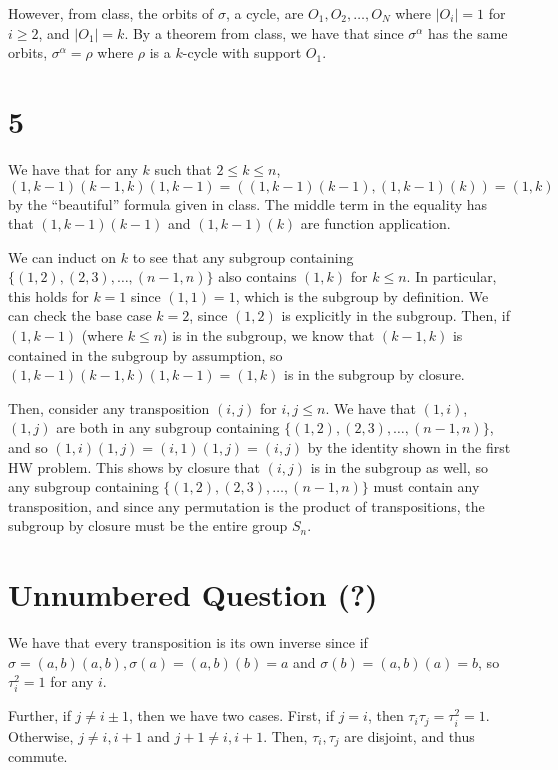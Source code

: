 \documentclass[12pt,letterpaper]{article}
\theoremstyle{definition}
\begin{document}
However, from class, the orbits of $\sigma$, a cycle, are $O_{1},O_{2},\dots, O_{N}$ where $|O_{i}| = 1$ for $i \geq 2$, and $|O_{1}| = k$. By a theorem from class, we have that since $\sigma^{\alpha}$ has the same orbits, $\sigma^{\alpha} = \rho$ where $\rho$ is a $k$-cycle with support $O_{1}$.

\section*{5}

We have that for any $k$ such that $2 \leq k \leq n$, $(1,k-1)(k-1, k)(1, k-1) = ((1,k-1)(k-1), (1,k-1)(k)) = (1,k)$ by the ``beautiful'' formula given in class. The middle term in the equality has that $(1, k-1)(k-1)$ and $(1,k-1)(k)$ are function application.

We can induct on $k$ to see that any subgroup containing $\{(1,2),(2,3),\dots,(n-1,n)\}$ also contains $(1,k)$ for $k \leq n$. In particular, this holds for $k = 1$ since $(1,1) = 1$, which is the subgroup by definition. We can check the base case $k = 2$, since $(1,2)$ is explicitly in the subgroup. Then, if $(1,k-1)$ (where $k \leq n$) is in the subgroup, we know that $(k-1, k)$ is contained in the subgroup by assumption, so $(1,k-1)(k-1,k)(1,k-1) = (1,k)$ is in the subgroup by closure.

Then, consider any transposition $(i,j)$ for $i,j \leq n$. We have that $(1,i)$, $(1,j)$ are both in any subgroup containing $\{(1,2),(2,3),\dots,(n-1,n)\}$, and so $(1,i)(1,j) = (i,1)(1,j) = (i,j)$ by the identity shown in the first HW problem. This shows by closure that $(i,j)$ is in the subgroup as well, so any subgroup containing $\{(1,2),(2,3),\dots,(n-1,n)\}$ must contain any transposition, and since any permutation is the product of transpositions, the subgroup by closure must be the entire group $S_{n}$.

\section*{Unnumbered Question (?)}

We have that every transposition is its own inverse since if $\sigma = (a,b)(a,b), \sigma(a) = (a,b)(b) = a$ and $\sigma(b) = (a,b)(a) = b$, so $\tau_{i}^{2} = 1$ for any $i$.

Further, if $j \neq i \pm 1$, then we have two cases. First, if $j = i$, then $\tau_{i}\tau_{j} = \tau_{i}^{2} = 1$. Otherwise, $j \neq i, i + 1$ and $j + 1 \neq i, i + 1$. Then, $\tau_{i},\tau_{j}$ are disjoint, and thus commute.
\end{document}
